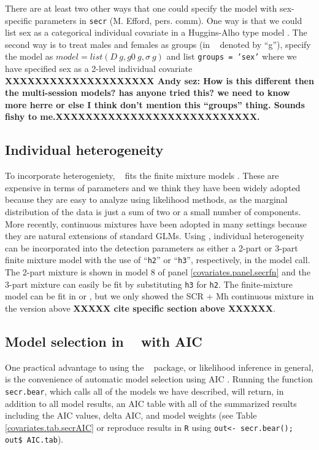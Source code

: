 There are at least two other ways that one could
specify the model with sex-specific parameters  in \mbox{\tt secr} (M. Efford, pers. comm).  One way is that we could
list sex as a categorical individual covariate in a Huggins-Alho type
model \citep{borchers_efford:2008}.
 The second way is to treat males and 
females as groups (in \secr~ denoted by ``g''), specify the
model as $model = list(D~g, g0~g, \sigma~g)$ and list \mbox{\tt groups = 'sex'}
where we have specified sex as a 2-level individual covariate 
{\bf XXXXXXXXXXXXXXXXXXXX Andy sez: How is this different then the
multi-session models? has anyone tried this? we need to know more herre or else
  I think don't mention this ``groups'' thing. Sounds fishy to me.XXXXXXXXXXXXXXXXXXXXXXXXXXX.  }


\subsection{Individual heterogeneity}
\label{covariates.sec.secrH2}

To incorporate heterogeniety, \secr~ fits the
finite mixture models \citep{norris_pollock:1996,
  pledger:2000}. These are expensive in terms of parameters and we think 
they have been widely adopted because they are easy to analyze using
likelihood methods, as the marginal distribution of the data is just a
sum of two or a small number of components.
More recently, continuous mixtures have been adopted in
many settings because they are natural extensions of standard GLMs. 
Using \secr,  individual heterogeneity can be incorporated
into the detection parameters as either a 2-part or 3-part finite
mixture model 
with the use of ``\mbox{\tt h2}'' or
``\mbox{\tt h3}'', respectively, in the
model call.   The 2-part mixture is shown in model 8 of panel
\ref{covariates.panel.secrfn} and the 3-part mixture can easily be fit by
substituting \mbox{\tt h3} for \mbox{\tt h2}.  
The finite-mixture model 
can be fit in \jags or \bugs, but we only showed
the SCR + Mh continuous mixture in the version above {\bf XXXXX cite
  specific section above XXXXXX}.


\subsection{Model selection in \secr~ with AIC}

One practical advantage to using the \secr~ package, or likelihood
inference in general, is the convenience of automatic model selection
using AIC \citep{burnham_anderson:1998}.
Running the function {\tt secr.bear}, which calls all of the models we
have described, will return, in addition to all model results, 
an AIC table with all of the summarized results including the AIC values,
delta AIC, and model weights (see Table \ref{covariates.tab.secrAIC}
or reproduce results in {\tt R} using {\tt out<- secr.bear(); out\$ AIC.tab}). 

